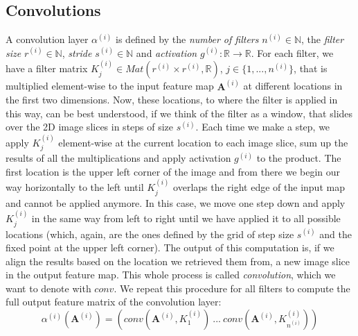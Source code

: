 \documentclass[12pt]{report}
\theoremstyle{definition}
\begin{document}
\subsection{Convolutions}

A convolution layer $\alpha^{(i)}$ is defined by the \emph{number of filters} $n^{(i)} \in \mathbb{N}$, the \emph{filter size} $r^{(i)}\in \mathbb{N}$, \emph{stride} $s^{(i)} \in \mathbb{N}$ and \emph{activation} $g^{(i)}: \mathbb{R} \rightarrow \mathbb{R}$. 
For each filter, we have a filter matrix $K^{(i)}_j \in Mat(r^{(i)} \times r^{(i)}, \mathbb{R})$, $j \in \{ 1, ..., n^{(i)}\}$,  that is multiplied element-wise to the input feature map $\mathbf{A}^{(i)}$ at different locations in the first two dimensions. Now, these locations, to where the filter is applied in this way, can be best understood, if we think of the filter as a window, that slides over the 2D image slices in steps of size $s^{(i)}$. Each time we make a step, we apply $K^{(i)}_j$ element-wise at the current location to each image slice, sum up the results of all the multiplications and apply activation $g^{(i)}$ to the product. 
The first location is the upper left corner of the image and from there we begin our way horizontally to the left until $K^{(i)}_j$ overlaps the right edge of the input map and cannot be applied anymore. In this case, we move one step down and apply $K^{(i)}_j$ in the same way from left to right until we have applied it to all possible locations (which, again, are the ones defined by the grid of step size $s^{(i)}$ and the fixed point at the upper left corner). 
The output of this computation is, if we align the results based on the location we retrieved them from, a new image slice in the output feature map. This whole process is called \emph{convolution}, which we want to denote with $conv$. We repeat this procedure for all filters to compute the full output feature matrix of the convolution layer:
\begin{equation}
\alpha^{(i)}(\mathbf{A}^{(i)}) = (conv(\mathbf{A}^{(i)}, K^{(i)}_1) \ ... \ conv(\mathbf{A}^{(i)}, K^{(i)}_{n^{(i)}})) 
\end{equation}
\end{document}
